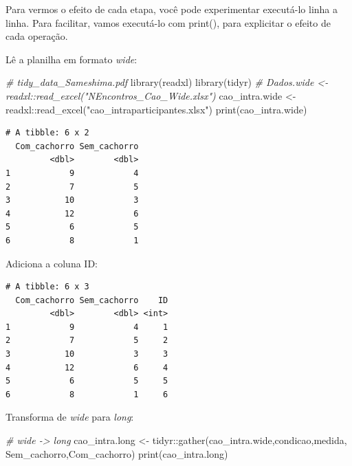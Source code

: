 \documentclass[
]{article}
\newenvironment{Shaded}{\begin{snugshade}}{\end{snugshade}}
\newcommand{\CommentTok}[1]{\textcolor[rgb]{0.56,0.35,0.01}{\textit{#1}}}
\newcommand{\DecValTok}[1]{\textcolor[rgb]{0.00,0.00,0.81}{#1}}
\newcommand{\FunctionTok}[1]{\textcolor[rgb]{0.00,0.00,0.00}{#1}}
\newcommand{\NormalTok}[1]{#1}
\newcommand{\OtherTok}[1]{\textcolor[rgb]{0.56,0.35,0.01}{#1}}
\newcommand{\SpecialCharTok}[1]{\textcolor[rgb]{0.00,0.00,0.00}{#1}}
\newcommand{\StringTok}[1]{\textcolor[rgb]{0.31,0.60,0.02}{#1}}
\begin{document}
Para vermos o efeito de cada etapa, você pode experimentar executá-lo
linha a linha. Para facilitar, vamos executá-lo com print(), para
explicitar o efeito de cada operação.

Lê a planilha em formato \emph{wide}:

\begin{Shaded}
\begin{Highlighting}[]
\CommentTok{\# tidy\_data\_Sameshima.pdf}
\FunctionTok{library}\NormalTok{(readxl)}
\FunctionTok{library}\NormalTok{(tidyr)}
\CommentTok{\# Dados.wide \textless{}{-} readxl::read\_excel("NEncontros\_Cao\_Wide.xlsx")}
\NormalTok{cao\_intra.wide }\OtherTok{\textless{}{-}}\NormalTok{ readxl}\SpecialCharTok{::}\FunctionTok{read\_excel}\NormalTok{(}\StringTok{"cao\_intraparticipantes.xlsx"}\NormalTok{)}
\FunctionTok{print}\NormalTok{(cao\_intra.wide)}
\end{Highlighting}
\end{Shaded}

\begin{verbatim}
# A tibble: 6 x 2
  Com_cachorro Sem_cachorro
         <dbl>        <dbl>
1            9            4
2            7            5
3           10            3
4           12            6
5            6            5
6            8            1
\end{verbatim}

Adiciona a coluna ID:

\begin{Shaded}
\end{Shaded}

\begin{verbatim}
# A tibble: 6 x 3
  Com_cachorro Sem_cachorro    ID
         <dbl>        <dbl> <int>
1            9            4     1
2            7            5     2
3           10            3     3
4           12            6     4
5            6            5     5
6            8            1     6
\end{verbatim}

Transforma de \emph{wide} para \emph{long}:

\begin{Shaded}
\begin{Highlighting}[]
\CommentTok{\# wide {-}\textgreater{} long}
\NormalTok{cao\_intra.long }\OtherTok{\textless{}{-}}\NormalTok{ tidyr}\SpecialCharTok{::}\FunctionTok{gather}\NormalTok{(cao\_intra.wide,condicao,medida,}
\NormalTok{                            Sem\_cachorro,Com\_cachorro)}
\FunctionTok{print}\NormalTok{(cao\_intra.long)}
\end{Highlighting}
\end{Shaded}
\end{document}
